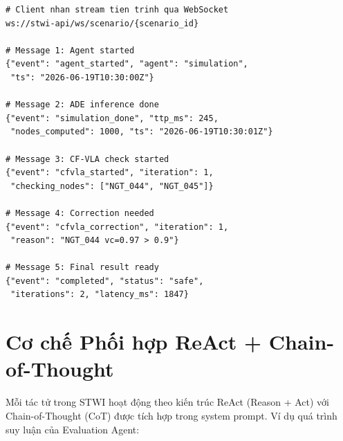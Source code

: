 \begin{lstlisting}[caption={WebSocket stream sự kiện tiến trình},label={lst:websocket}]
# Client nhan stream tien trinh qua WebSocket
ws://stwi-api/ws/scenario/{scenario_id}

# Message 1: Agent started
{"event": "agent_started", "agent": "simulation",
 "ts": "2026-06-19T10:30:00Z"}

# Message 2: ADE inference done
{"event": "simulation_done", "ttp_ms": 245,
 "nodes_computed": 1000, "ts": "2026-06-19T10:30:01Z"}

# Message 3: CF-VLA check started
{"event": "cfvla_started", "iteration": 1,
 "checking_nodes": ["NGT_044", "NGT_045"]}

# Message 4: Correction needed
{"event": "cfvla_correction", "iteration": 1,
 "reason": "NGT_044 vc=0.97 > 0.9"}

# Message 5: Final result ready
{"event": "completed", "status": "safe",
 "iterations": 2, "latency_ms": 1847}
\end{lstlisting}

\section{Cơ chế Phối hợp ReAct + Chain-of-Thought}

Mỗi tác tử trong STWI hoạt động theo kiến trúc ReAct (Reason + Act) với Chain-of-Thought (CoT) được tích hợp trong system prompt. Ví dụ quá trình suy luận của Evaluation Agent:

